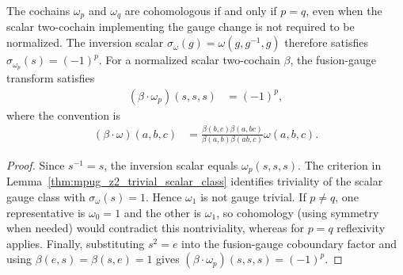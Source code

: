 \begin{lemma}
    \label{thm:asymex_z2_classes}
    \leanok
    The cochains $\omega_p$ and $\omega_q$ are cohomologous if and
    only if $p=q$, even when the scalar two-cochain implementing the
    gauge change is not required to be normalized.
    The inversion scalar $\sigma_\omega(g)=\omega(g,g^{-1},g)$
    therefore satisfies $\sigma_{\omega_p}(s)=(-1)^p$.
    For a normalized scalar two-cochain $\beta$, the fusion-gauge
    transform satisfies
    \begin{align}
        (\beta\cdot\omega_p)(s,s,s) & =(-1)^p,
    \end{align}
    where the convention is
    \begin{align}
        (\beta\cdot\omega)(a,b,c)
         & =\frac{\beta(b,c)\beta(a,bc)}
        {\beta(a,b)\beta(ab,c)}\omega(a,b,c).
    \end{align}
\end{lemma}
\begin{proof}
    \leanok
    Since $s^{-1}=s$, the inversion scalar equals
    $\omega_p(s,s,s)$. The criterion in Lemma~\ref{thm:mpug_z2_trivial_scalar_class}
    identifies triviality of the scalar gauge
    class with $\sigma_\omega(s)=1$. Hence $\omega_1$ is not
    gauge trivial. If $p\neq q$, one representative is $\omega_0=1$
    and the other is $\omega_1$, so cohomology (using symmetry when
    needed) would contradict this nontriviality, whereas for $p=q$
    reflexivity applies. Finally, substituting $s^2=e$ into the
    fusion-gauge coboundary factor and using $\beta(e,s)=\beta(s,e)=1$
    gives $(\beta\cdot\omega_p)(s,s,s)=(-1)^p$.
\end{proof}
